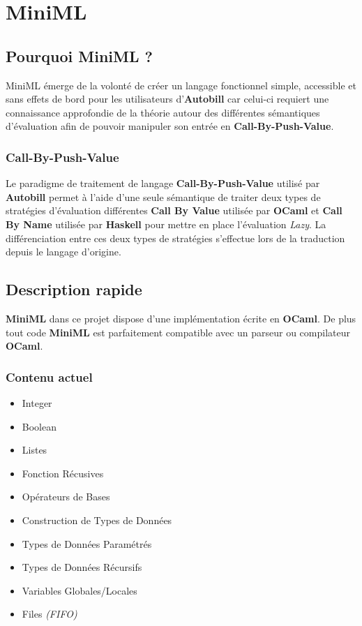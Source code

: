 \documentclass[
  12pt,
]{article}
\providecommand{\tightlist}{%
  \setlength{\itemsep}{0pt}\setlength{\parskip}{0pt}}
\begin{document}
\hypertarget{miniml}{%
\section{MiniML}\label{miniml}}

\hypertarget{pourquoi-miniml}{%
\subsection{Pourquoi MiniML ?}\label{pourquoi-miniml}}

MiniML émerge de la volonté de créer un langage fonctionnel simple,
accessible et sans effets de bord pour les utilisateurs
d'\textbf{Autobill} car celui-ci requiert une connaissance approfondie
de la théorie autour des différentes sémantiques d'évaluation afin de
pouvoir manipuler son entrée en \textbf{Call-By-Push-Value}.

\hypertarget{call-by-push-value}{%
\subsubsection{Call-By-Push-Value}\label{call-by-push-value}}

Le paradigme de traitement de langage \textbf{Call-By-Push-Value}
utilisé par \textbf{Autobill} permet à l'aide d'une seule sémantique de
traiter deux types de stratégies d'évaluation différentes \textbf{Call
By Value} utilisée par \textbf{OCaml} et \textbf{Call By Name} utilisée
par \textbf{Haskell} pour mettre en place l'évaluation \emph{Lazy}. La
différenciation entre ces deux types de stratégies s'effectue lors de la
traduction depuis le langage d'origine.

\hypertarget{description-rapide}{%
\subsection{Description rapide}\label{description-rapide}}

\textbf{MiniML} dans ce projet dispose d'une implémentation écrite en
\textbf{OCaml}. De plus tout code \textbf{MiniML} est parfaitement
compatible avec un parseur ou compilateur \textbf{OCaml}.

\hypertarget{contenu-actuel}{%
\subsubsection{Contenu actuel}\label{contenu-actuel}}

\begin{itemize}
\tightlist
\item
  Integer
\item
  Boolean
\item
  Listes
\item
  Fonction Récusives
\item
  Opérateurs de Bases
\item
  Construction de Types de Données
\item
  Types de Données Paramétrés
\item
  Types de Données Récursifs
\item
  Variables Globales/Locales
\item
  Files \emph{(FIFO)}
\end{itemize}
\end{document}
